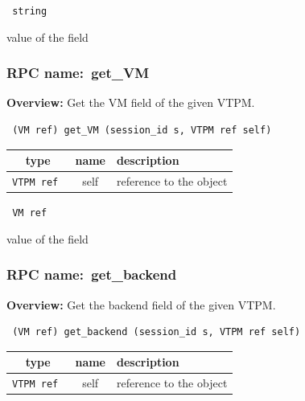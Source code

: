 \vspace{0.3cm}

{\tt 
string
}


value of the field
\vspace{0.3cm}
\vspace{0.3cm}
\vspace{0.3cm}
\subsubsection{RPC name:~get\_VM}

{\bf Overview:} 
Get the VM field of the given VTPM.

\begin{verbatim} (VM ref) get_VM (session_id s, VTPM ref self)\end{verbatim}



 
\vspace{0.3cm}
\begin{tabular}{|c|c|p{7cm}|}
 \hline
{\bf type} & {\bf name} & {\bf description} \\ \hline
{\tt VTPM ref } & self & reference to the object \\ \hline 

\end{tabular}

\vspace{0.3cm}

{\tt 
VM ref
}


value of the field
\vspace{0.3cm}
\vspace{0.3cm}
\vspace{0.3cm}
\subsubsection{RPC name:~get\_backend}

{\bf Overview:} 
Get the backend field of the given VTPM.

\begin{verbatim} (VM ref) get_backend (session_id s, VTPM ref self)\end{verbatim}



 
\vspace{0.3cm}
\begin{tabular}{|c|c|p{7cm}|}
 \hline
{\bf type} & {\bf name} & {\bf description} \\ \hline
{\tt VTPM ref } & self & reference to the object \\ \hline 

\end{tabular}

